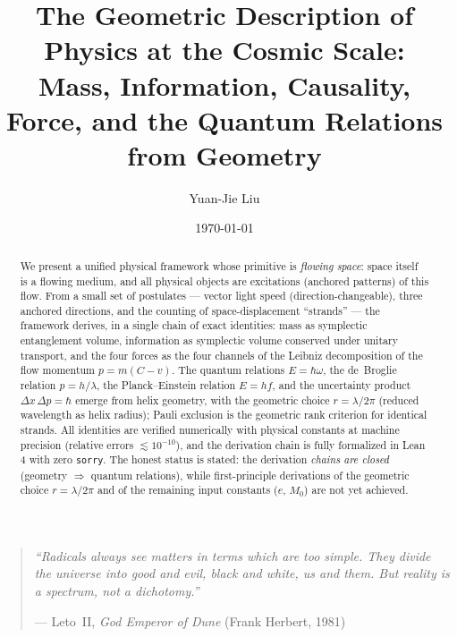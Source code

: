 \documentclass[aps,prd,preprint,superscriptaddress,amsmath,amssymb]{revtex4-2}
\begin{document}
\title{The Geometric Description of Physics at the Cosmic Scale:\\ Mass, Information, Causality, Force, and the Quantum Relations from Geometry}

\author{Yuan-Jie Liu}

\date{\today}

\begin{abstract}
We present a unified physical framework whose primitive is \emph{flowing
space}: space itself is a flowing medium, and all physical objects are
excitations (anchored patterns) of this flow.  From a small set of
postulates --- vector light speed (direction-changeable), three anchored
directions, and the counting of space-displacement ``strands'' --- the
framework derives, in a single chain of exact identities: mass as
symplectic entanglement volume, information as symplectic volume
conserved under unitary transport, and the four forces as the four
channels of the Leibniz decomposition of the flow momentum
$p=m(C-v)$.  The quantum relations $E=\hbar\omega$, the de~Broglie
relation $p=h/\lambda$, the Planck--Einstein relation $E=hf$, and the
uncertainty product $\Delta x\,\Delta p=\hbar$ emerge from helix
geometry, with the geometric choice $r=\lambda/2\pi$ (reduced wavelength
as helix radius); Pauli exclusion is the geometric rank criterion for
identical strands.  All identities are verified numerically with physical
constants at machine precision (relative errors $\lesssim 10^{-10}$), and
the derivation chain is fully formalized in Lean 4 with zero
\texttt{sorry}.  The honest status is
stated: the derivation \emph{chains are closed} (geometry $\Rightarrow$
quantum relations), while first-principle derivations of the geometric
choice $r=\lambda/2\pi$ and of the remaining input constants ($e$, $M_0$)
are not yet achieved.
\end{abstract}

\maketitle

\begin{quote}
\itshape
``Radicals always see matters in terms which are too simple. They divide
the universe into good and evil, black and white, us and them. But reality
is a spectrum, not a dichotomy.''
\par
\hfill --- Leto~II, \textit{God Emperor of Dune} (Frank Herbert, 1981)
\end{quote}
\end{document}

